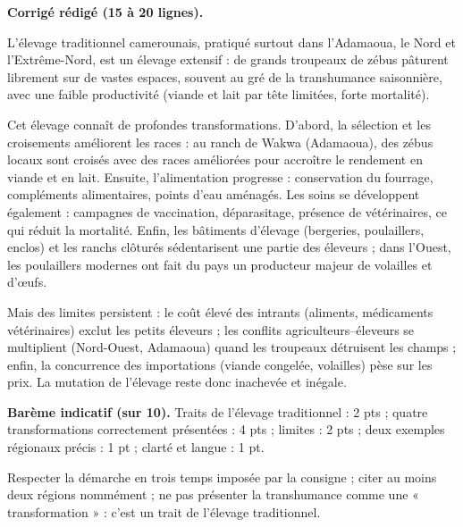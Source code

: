 \documentclass[11pt]{article}
\begin{document}
\begin{corrige}
\textbf{Corrigé rédigé (15 à 20 lignes).}

L'élevage traditionnel camerounais, pratiqué surtout dans l'Adamaoua, le Nord et l'Extrême-Nord, est un élevage extensif : de grands troupeaux de zébus pâturent librement sur de vastes espaces, souvent au gré de la transhumance saisonnière, avec une faible productivité (viande et lait par tête limitées, forte mortalité).

Cet élevage connaît de profondes transformations. D'abord, la sélection et les croisements améliorent les races : au ranch de Wakwa (Adamaoua), des zébus locaux sont croisés avec des races améliorées pour accroître le rendement en viande et en lait. Ensuite, l'alimentation progresse : conservation du fourrage, compléments alimentaires, points d'eau aménagés. Les soins se développent également : campagnes de vaccination, déparasitage, présence de vétérinaires, ce qui réduit la mortalité. Enfin, les bâtiments d'élevage (bergeries, poulaillers, enclos) et les ranchs clôturés sédentarisent une partie des éleveurs ; dans l'Ouest, les poulaillers modernes ont fait du pays un producteur majeur de volailles et d'œufs.

Mais des limites persistent : le coût élevé des intrants (aliments, médicaments vétérinaires) exclut les petits éleveurs ; les conflits agriculteurs--éleveurs se multiplient (Nord-Ouest, Adamaoua) quand les troupeaux détruisent les champs ; enfin, la concurrence des importations (viande congelée, volailles) pèse sur les prix. La mutation de l'élevage reste donc inachevée et inégale.

\textbf{Barème indicatif (sur 10).} Traits de l'élevage traditionnel : 2 pts ; quatre transformations correctement présentées : 4 pts ; limites : 2 pts ; deux exemples régionaux précis : 1 pt ; clarté et langue : 1 pt.

\begin{attention}
Respecter la démarche en trois temps imposée par la consigne ; citer au moins deux régions nommément ; ne pas présenter la transhumance comme une « transformation » : c'est un trait de l'élevage traditionnel.
\end{attention}
\end{corrige}
\end{document}

